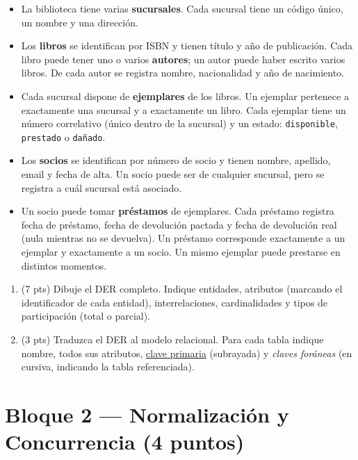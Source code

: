 \documentclass[11pt,a4paper]{article}
\begin{document}
\begin{itemize}
  \item La biblioteca tiene varias \textbf{sucursales}. Cada sucursal tiene un código único, un nombre y una dirección.
  \item Los \textbf{libros} se identifican por ISBN y tienen título y año de publicación. Cada libro puede tener uno o varios \textbf{autores}; un autor puede haber escrito varios libros. De cada autor se registra nombre, nacionalidad y año de nacimiento.
  \item Cada sucursal dispone de \textbf{ejemplares} de los libros. Un ejemplar pertenece a exactamente una sucursal y a exactamente un libro. Cada ejemplar tiene un número correlativo (único dentro de la sucursal) y un estado: \texttt{disponible}, \texttt{prestado} o \texttt{dañado}.
  \item Los \textbf{socios} se identifican por número de socio y tienen nombre, apellido, email y fecha de alta. Un socio puede ser de cualquier sucursal, pero se registra a cuál sucursal está asociado.
  \item Un socio puede tomar \textbf{préstamos} de ejemplares. Cada préstamo registra fecha de préstamo, fecha de devolución pactada y fecha de devolución real (nula mientras no se devuelva). Un préstamo corresponde exactamente a un ejemplar y exactamente a un socio. Un mismo ejemplar puede prestarse en distintos momentos.
\end{itemize}

\begin{enumerate}
  \item (7 pts) Dibuje el DER completo. Indique entidades, atributos (marcando el identificador de cada entidad), interrelaciones, cardinalidades y tipos de participación (total o parcial).

  \vspace{12cm}

  \item (3 pts) Traduzca el DER al modelo relacional. Para cada tabla indique nombre, todos sus atributos, \underline{clave primaria} (subrayada) y \textit{claves foráneas} (en cursiva, indicando la tabla referenciada).
\end{enumerate}

\newpage

\section*{Bloque 2 — Normalización y Concurrencia \hfill\normalfont(4 puntos)}
\end{document}
